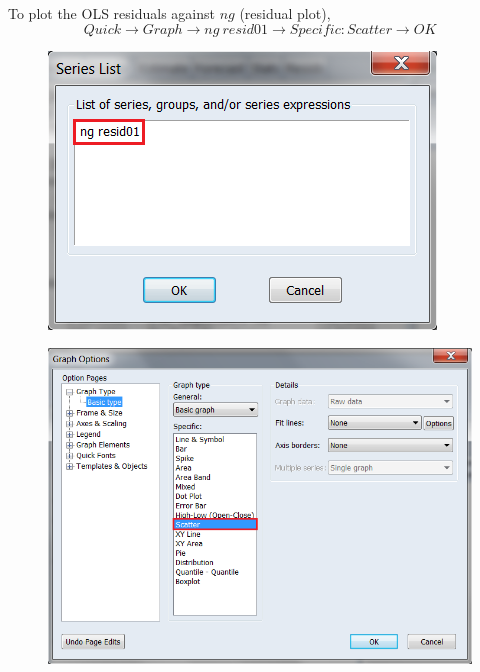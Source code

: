 \documentclass[12pt]{report}
\begin{document}
\noindent To plot the OLS residuals against $ng$ (residual plot),
$$Quick \to Graph \to ng\ resid01 \to Specific:Scatter \to OK$$
\begin{figure}[H]
	\centering
	\includegraphics{q1_4}
\end{figure}
\vspace{-\baselineskip}
\begin{figure}[H]
	\centering
	\includegraphics{q1_5}
\end{figure}
\vspace{-\baselineskip}
\end{document}
